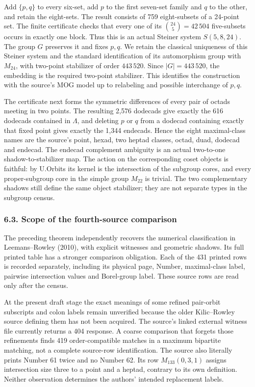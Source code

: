 \documentclass[
  11pt,
  a4paper,
]{article}
\begin{document}
Add \(\{p,q\}\) to every six-set, add \(p\) to the first seven-set
family and \(q\) to the other, and retain the eight-sets. The result
consists of 759 eight-subsets of a 24-point set. The finite certificate
checks that every one of its \(\binom{24}{5}=42\,504\) five-subsets
occurs in exactly one block. Thus this is an actual Steiner system
\(S(5,8,24)\). The group \(G\) preserves it and fixes \(p,q\). We retain
the classical uniqueness of this Steiner system and the standard
identification of its automorphism group with \(M_{24}\), with two-point
stabilizer of order \(443\,520\). Since \(|G|=443\,520\), the embedding
is the required two-point stabilizer. This identifies the construction
with the source's MOG model up to relabeling and possible interchange of
\(p,q\).

The certificate next forms the symmetric differences of every pair of
octads meeting in two points. The resulting 2,576 dodecads give exactly
the 616 dodecads contained in \(\Lambda\), and deleting \(p\) or \(q\)
from a dodecad containing exactly that fixed point gives exactly the
1,344 endecads. Hence the eight maximal-class names are the source's
point, hexad, two heptad classes, octad, duad, dodecad and endecad. The
endecad complement ambiguity is an actual two-to-one
shadow-to-stabilizer map. The action on the corresponding coset objects
is faithful: by U.Orbits its kernel is the intersection of the subgroup
cores, and every proper-subgroup core in the simple group \(M_{22}\) is
trivial. The two complementary shadows still define the same object
stabilizer; they are not separate types in the subgroup census.

\subsubsection{6.3. Scope of the fourth-source
comparison}\label{scope-of-the-fourth-source-comparison}

The preceding theorem independently recovers the numerical
classification in Leemans--Rowley (2010), with explicit witnesses and
geometric shadows. Its full printed table has a stronger comparison
obligation. Each of the 431 printed rows is recorded separately,
including its physical page, Number, maximal-class label, pairwise
intersection values and Borel-group label. These source rows are read
only after the census.

At the present draft stage the exact meanings of some refined pair-orbit
subscripts and colon labels remain unverified because the older
Kilic--Rowley source defining them has not been acquired. The source's
linked external witness file currently returns a 404 response. A coarse
comparison that forgets those refinements finds 419 order-compatible
matches in a maximum bipartite matching, not a complete source-row
identification. The source also literally prints Number 61 twice and no
Number 62. Its row \(M_{133}(0,3,1)\) assigns intersection size three to
a point and a heptad, contrary to its own definition. Neither
observation determines the authors' intended replacement labels.
\end{document}
